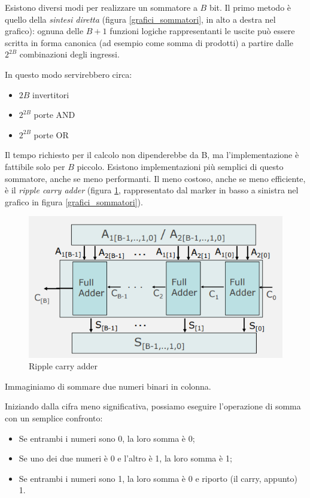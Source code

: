 \documentclass{article}
\begin{document}
Esistono diversi modi per realizzare un sommatore a $B$ bit. Il primo metodo è quello della \textit{sintesi diretta} (figura \ref{grafici_sommatori}, in alto a destra nel grafico): ognuna delle $B+1$ funzioni logiche rappresentanti le uscite può essere scritta in forma canonica (ad esempio come somma di prodotti) a partire dalle $2^{2B}$ combinazioni degli ingressi. 

\vspace{1mm}

In questo modo servirebbero circa:
\begin{itemize}
  \item $2B$ invertitori
  \item $2^{2B}$ porte AND
  \item $2^{2B}$ porte OR
\end{itemize}

Il tempo richiesto per il calcolo non dipenderebbe da B, ma l’implementazione è fattibile solo per $B$ piccolo. Esistono implementazioni più semplici di questo sommatore, anche se meno performanti. Il meno costoso, anche se meno efficiente, è il \textit{ripple carry adder} (figura \ref{ripple_carry_adder}, rappresentato dal marker in basso a sinistra nel grafico in figura \ref{grafici_sommatori}).
\clearpage
\begin{figure}[h]
  \centering
  \includegraphics[scale=0.7]{IM_ripple_carry_adder}
  \caption{Ripple carry adder}
  \label{ripple_carry_adder}
\end{figure}

Immaginiamo di sommare due numeri binari in colonna.

\vspace{1mm}

Iniziando dalla cifra meno significativa, possiamo eseguire l'operazione di somma con un semplice confronto:
\begin{itemize}
  \item [\textendash] Se entrambi i numeri sono 0, la loro somma è 0;
  \item [\textendash] Se uno dei due numeri è 0 e l'altro è 1, la loro somma è 1;
  \item [\textendash] Se entrambi i numeri sono 1, la loro somma è 0 e riporto (il carry, appunto) 1.
\end{itemize}
\end{document}
